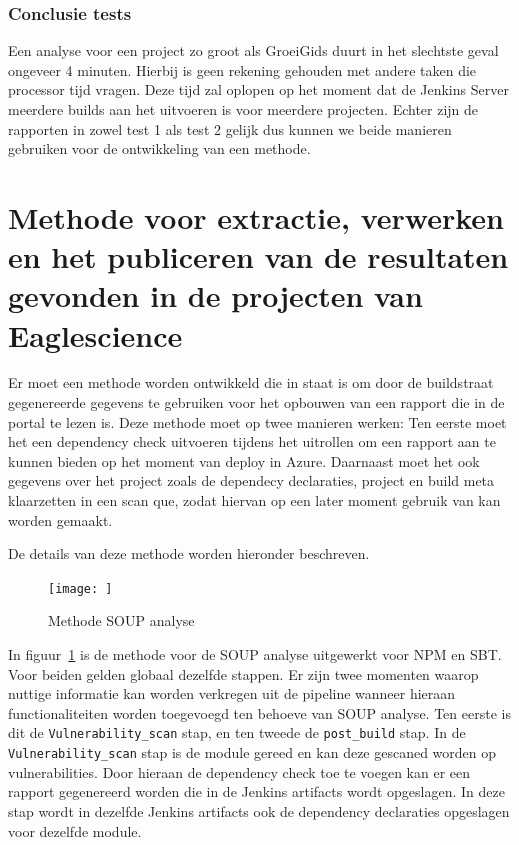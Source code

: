 \subsubsection{Conclusie tests}
Een analyse voor een project zo groot als GroeiGids duurt in het slechtste geval ongeveer 4 minuten. Hierbij is geen rekening gehouden met andere taken die processor tijd vragen. Deze tijd zal oplopen op het moment dat de Jenkins Server meerdere builds aan het uitvoeren is voor meerdere projecten. Echter zijn de rapporten in zowel test 1 als test 2 gelijk dus kunnen we beide manieren gebruiken voor de ontwikkeling van een methode.


\newpage
\section{Methode voor extractie, verwerken en het publiceren van de resultaten gevonden in de projecten van Eaglescience}\label{subsec:methodeSOUPES}

Er moet een methode worden ontwikkeld die in staat is om door de buildstraat gegenereerde gegevens te gebruiken voor het opbouwen van een rapport die in de portal te lezen is.
Deze methode moet op twee manieren werken:
Ten eerste moet het een dependency check uitvoeren tijdens het uitrollen om een rapport aan te kunnen bieden op het moment van deploy in Azure. Daarnaast moet het ook gegevens over het project zoals de dependecy declaraties, project en build meta klaarzetten in een scan que, zodat hiervan op een later moment gebruik van kan worden gemaakt.

De details van deze methode worden hieronder beschreven.

\begin{figure}
    \centering
    \texttt{[image: ]}
    \caption{Methode SOUP analyse}
    \label{fig:methodeSOUPanalyse}
\end{figure}

In figuur~\ref{fig:methodeSOUPanalyse} is de methode voor de SOUP analyse uitgewerkt voor NPM en SBT. Voor beiden gelden globaal dezelfde stappen. Er zijn twee momenten waarop nuttige informatie kan worden verkregen uit de pipeline wanneer hieraan functionaliteiten worden toegevoegd ten behoeve van SOUP analyse. Ten eerste is dit de \texttt{Vulnerability\_scan} stap, en ten tweede de \texttt{post\_build} stap. In de \texttt{Vulnerability\_scan} stap is de module gereed en kan deze gescaned worden op vulnerabilities. Door hieraan de dependency check toe te voegen kan er een rapport gegenereerd worden die in de Jenkins artifacts wordt opgeslagen. In deze stap wordt in dezelfde Jenkins artifacts ook de dependency declaraties opgeslagen voor dezelfde module.

